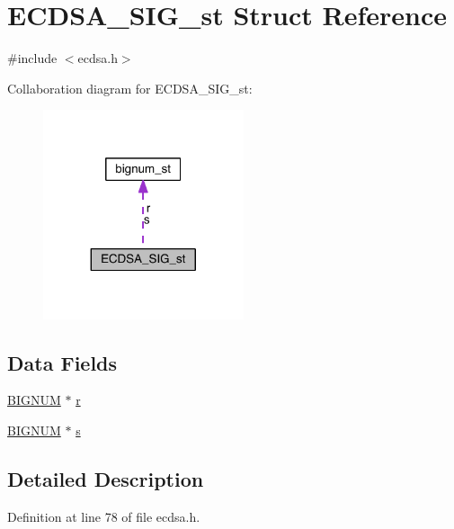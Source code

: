 \hypertarget{struct_e_c_d_s_a___s_i_g__st}{}\section{E\+C\+D\+S\+A\+\_\+\+S\+I\+G\+\_\+st Struct Reference}
\label{struct_e_c_d_s_a___s_i_g__st}


{\ttfamily \#include $<$ecdsa.\+h$>$}



Collaboration diagram for E\+C\+D\+S\+A\+\_\+\+S\+I\+G\+\_\+st\+:\nopagebreak
\begin{figure}[H]
\begin{center}
\leavevmode
\includegraphics[width=167pt]{struct_e_c_d_s_a___s_i_g__st__coll__graph}
\end{center}
\end{figure}
\subsection*{Data Fields}
\begin{DoxyCompactItemize}
\item 
\hyperlink{crypto_2ossl__typ_8h_a6fb19728907ec6515e4bfb716bffa141}{B\+I\+G\+N\+UM} $\ast$ \hyperlink{struct_e_c_d_s_a___s_i_g__st_a9e16dc92f95ba02ecb83b7cf0b345c78}{r}
\item 
\hyperlink{crypto_2ossl__typ_8h_a6fb19728907ec6515e4bfb716bffa141}{B\+I\+G\+N\+UM} $\ast$ \hyperlink{struct_e_c_d_s_a___s_i_g__st_a174fa2d60f08e563a4405911f6c81172}{s}
\end{DoxyCompactItemize}


\subsection{Detailed Description}


Definition at line 78 of file ecdsa.\+h.



